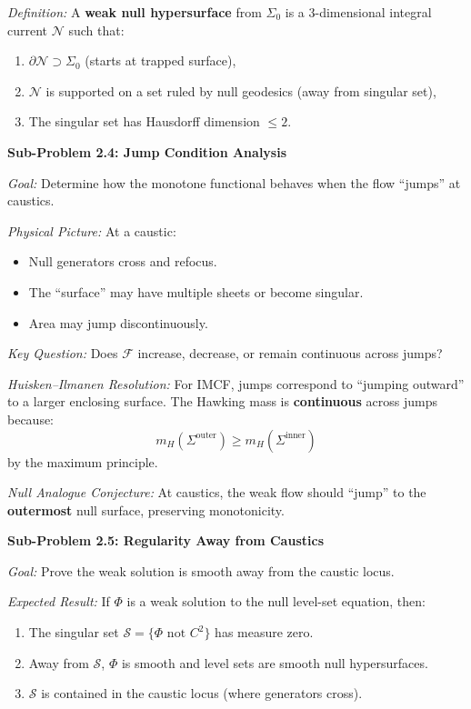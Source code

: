 \textit{Definition:} A \textbf{weak null hypersurface} from $\Sigma_0$ is a 3-dimensional integral current $\mathcal{N}$ such that:
\begin{enumerate}
    \item $\partial\mathcal{N} \supset \Sigma_0$ (starts at trapped surface),
    \item $\mathcal{N}$ is supported on a set ruled by null geodesics (away from singular set),
    \item The singular set has Hausdorff dimension $\leq 2$.
\end{enumerate}

\textbf{Sub-Problem 2.4: Jump Condition Analysis}

\textit{Goal:} Determine how the monotone functional behaves when the flow ``jumps'' at caustics.

\textit{Physical Picture:} At a caustic:
\begin{itemize}
    \item Null generators cross and refocus.
    \item The ``surface'' may have multiple sheets or become singular.
    \item Area may jump discontinuously.
\end{itemize}

\textit{Key Question:} Does $\mathcal{F}$ increase, decrease, or remain continuous across jumps?

\textit{Huisken--Ilmanen Resolution:} For IMCF, jumps correspond to ``jumping outward'' to a larger enclosing surface. The Hawking mass is \textbf{continuous} across jumps because:
\begin{equation}
    m_H(\Sigma^{\text{outer}}) \geq m_H(\Sigma^{\text{inner}})
\end{equation}
by the maximum principle.

\textit{Null Analogue Conjecture:} At caustics, the weak flow should ``jump'' to the \textbf{outermost} null surface, preserving monotonicity.

\textbf{Sub-Problem 2.5: Regularity Away from Caustics}

\textit{Goal:} Prove the weak solution is smooth away from the caustic locus.

\textit{Expected Result:} If $\Phi$ is a weak solution to the null level-set equation, then:
\begin{enumerate}
    \item The singular set $\mathcal{S} = \{\Phi \text{ not } C^2\}$ has measure zero.
    \item Away from $\mathcal{S}$, $\Phi$ is smooth and level sets are smooth null hypersurfaces.
    \item $\mathcal{S}$ is contained in the caustic locus (where generators cross).
\end{enumerate}

